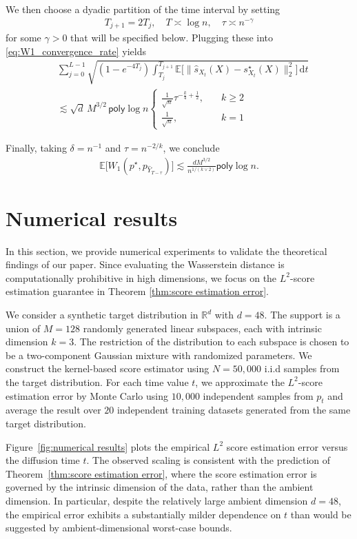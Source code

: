 \documentclass{article}
\newcommand{\bE}{\mathbb{E}}
\newcommand{\diff}{\,\mathrm{d}}
\newcommand{\polylog}{\mathsf{poly}\log}
\theoremstyle{plain}
\theoremstyle{remark}
\begin{document}
We then choose a dyadic partition of the time interval by setting
\begin{align*}
    T_{j+1} = 2T_j, \quad T \asymp \log n, \quad \tau\asymp n^{-\gamma} 
\end{align*}
for some $\gamma>0$ that will be specified below. Plugging these into \eqref{eq:W1_convergence_rate} yields
\begin{align*}
    &\sum_{j=0}^{L-1} \sqrt{(1-e^{-4T_j})\int_{T_j}^{T_{j+1}} \mathbb{E}\big[ \| \widehat{s}_{X_t}(X)-s^\star_{X_t}(X)\|_2^2\big] \diff t} \\
    &\lesssim \sqrt{d} \, M^{3/2} \,\polylog n 
    \begin{cases}
        \frac{1}{\sqrt{n}}\tau^{-\frac{k}{4}+\frac{1}{2}}, \quad &k\geq 2 \\
        \frac{1}{\sqrt{n}}, & k=1
    \end{cases}
\end{align*}

Finally, taking $\delta = n^{-1}$ and $\tau = n^{-2/k}$, we conclude
\begin{align*}
    \bE\big[W_1(p^\star,p_{\widehat{Y}_{T-\tau}})\big] \lesssim \frac{dM^{3/2}}{n^{1/(k\vee 2)}} \polylog n.
\end{align*}
\section{Numerical results}
\label{sec:numerical results}
In this section, we provide numerical experiments to validate the theoretical findings of our paper.
Since evaluating the Wasserstein distance is computationally prohibitive in high dimensions, we focus on the $L^2$-score estimation guarantee in Theorem \ref{thm:score estimation error}.

We consider a synthetic target distribution in $\mathbb{R}^d$ with $d=48$. The support is a union of $M=128$ randomly generated linear subspaces, each with intrinsic dimension $k=3$.
The restriction of the distribution to each subspace is chosen to be a two-component Gaussian mixture with randomized parameters. 
We construct the kernel-based score estimator using $N=50,000$ i.i.d samples from the target distribution. 
For each time value $t$, we approximate the $L^2$-score estimation error by Monte Carlo using $10{,}000$ independent samples from $p_t$ and average the result over $20$ independent training datasets generated from the same target distribution.


Figure~\ref{fig:numerical results} plots the empirical $L^2$ score estimation error versus the diffusion time $t$. The observed scaling is consistent with the prediction of Theorem~\ref{thm:score estimation error}, where the score estimation error is governed by the intrinsic dimension of the data, rather than the ambient dimension. In particular, despite the relatively large ambient dimension $d=48$, the empirical error exhibits a substantially milder dependence on $t$ than would be suggested by ambient-dimensional worst-case bounds.
\end{document}
